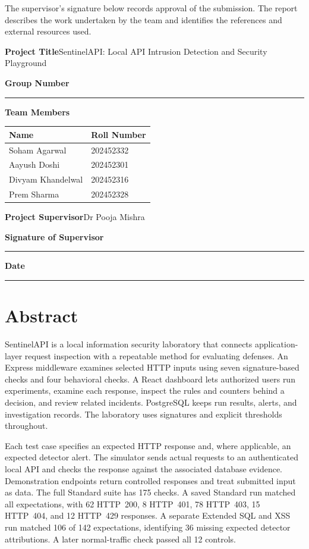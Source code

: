\documentclass[11pt,letterpaper,oneside]{report}
\newcommand{\ProjectTitle}{SentinelAPI}
\newcommand{\ProjectSubtitle}{Local API Intrusion Detection and Security Playground}
\newcommand{\Supervisor}{Dr Pooja Mishra}
\newcommand{\TeamRows}{Soham Agarwal & 202452332\\Aayush Doshi & 202452301\\Divyam Khandelwal & 202452316\\Prem Sharma & 202452328\\}
\begin{document}
The supervisor's signature below records approval of the submission. The report describes the work undertaken by the team and identifies the references and external resources used.

\bigskip
\textbf{Project Title}\quad \ProjectTitle: \ProjectSubtitle

\textbf{Group Number}\quad\rule{2.35in}{.4pt}

\bigskip
\textbf{Team Members}
\begin{center}
\begin{tabular}{@{}p{.51\linewidth}p{.26\linewidth}@{}}
\toprule
\textbf{Name} & \textbf{Roll Number}\\
\midrule
\TeamRows
\bottomrule
\end{tabular}
\end{center}
\bigskip
\textbf{Project Supervisor}\quad \Supervisor

\vspace{.75in}
\textbf{Signature of Supervisor}\quad\rule{2.3in}{.4pt}

\textbf{Date}\quad\rule{2.3in}{.4pt}

\chapter*{Abstract}
SentinelAPI is a local information security laboratory that connects application-layer request inspection with a repeatable method for evaluating defenses. An Express middleware examines selected HTTP inputs using seven signature-based checks and four behavioral checks. A React dashboard lets authorized users run experiments, examine each response, inspect the rules and counters behind a decision, and review related incidents. PostgreSQL keeps run results, alerts, and investigation records. The laboratory uses signatures and explicit thresholds throughout.

Each test case specifies an expected HTTP response and, where applicable, an expected detector alert. The simulator sends actual requests to an authenticated local API and checks the response against the associated database evidence. Demonstration endpoints return controlled responses and treat submitted input as data. The full Standard suite has 175 checks. A saved Standard run matched all expectations, with 62 HTTP~200, 8 HTTP~401, 78 HTTP~403, 15 HTTP~404, and 12 HTTP~429 responses. A separate Extended SQL and XSS run matched 106 of 142 expectations, identifying 36 missing expected detector attributions. A later normal-traffic check passed all 12 controls.
\end{document}
